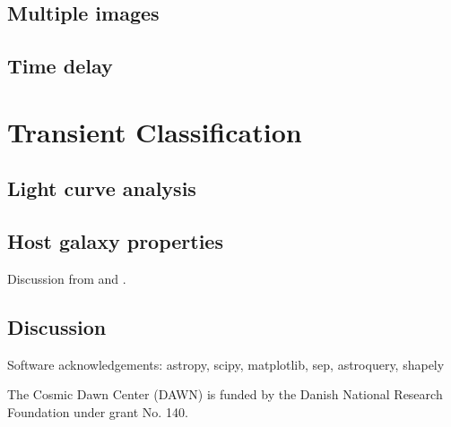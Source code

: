 \documentclass[twocolumn]{aastex63}
\begin{document}
\subsection{Multiple images}
\label{ss:images}

\subsection{Time delay}
\label{ss:timedelay}

\section{Transient Classification}
\label{s:classifiation}

\subsection{Light curve analysis}
\label{ss:lightcurve}

\subsection{Host galaxy properties}
\label{ss:host}

Discussion from \cite{Newman2018a} and \cite{Newman2018b}.

\subsection{Discussion}
\label{s:discussion}

\acknowledgments

{}


Software acknowledgements: astropy, scipy, matplotlib, sep, astroquery, shapely

The Cosmic Dawn Center (DAWN) is funded by the Danish National Research Foundation under grant No. 140. 
\end{document}

